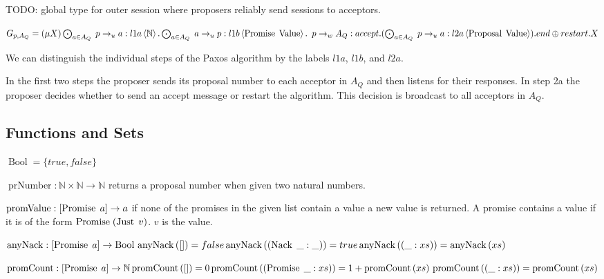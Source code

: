 TODO: global type for outer session where proposers reliably send sessions to acceptors.

$G_{p, A_Q} = (\mu X) \bigodot_{a \in A_Q}\; p \to_u a : l1a \left\langle \mathbb{N} \right\rangle . \bigodot_{a \in A_Q}\; a \to_u p : l1b \left\langle \operatorname{Promise}\; \operatorname{Value} \right\rangle .\\
\hspace*{0.5em}p \to_w A_Q : accept.(\bigodot_{a \in A_Q}\; p \to_u a : l2a \left\langle \operatorname{Proposal}\; \operatorname{Value} \right\rangle).end \oplus restart.X$

We can distinguish the individual steps of the Paxos algorithm by the labels $l1a$, $l1b$, and $l2a$.

In the first two steps the proposer sends its proposal number to each acceptor in $A_Q$ and then listens for their responses.
In step 2a the proposer decides whether to send an accept message or restart the algorithm.
This decision is broadcast to all acceptors in $A_Q$.

\subsection{Functions and Sets}
\newcommand{\Bool}[0]{\operatorname{Bool}}
\newcommand{\prNumber}[2]{\operatorname{prNumber}\left( #1, #2 \right)}
\newcommand{\promValue}[1]{\operatorname{promValue}\left(#1\right)}
\newcommand{\anyNack}[1]{\operatorname{anyNack}\left(#1\right)}
\newcommand{\promCount}[1]{\operatorname{promCount}\left(#1\right)}
\newcommand{\greaterThan}[2]{\operatorname{gt}\left(#1, #2\right)}
\newcommand{\greaterEqual}[2]{\operatorname{ge}\left(#1, #2\right)}
\newcommand{\nFromPr}[1]{\operatorname{nFromPr}\left(#1 \right)}

$\Bool = \{ true, false \}$

$\operatorname{prNumber} : \mathbb{N} \times \mathbb{N} \to \mathbb{N}$ returns a proposal number when given two natural numbers.

$\operatorname{promValue} : [\operatorname{Promise}\; a] \to a$ if none of the promises in the given list contain a value a new value is returned.
A promise contains a value if it is of the form $\operatorname{Promise}\; (\operatorname{Just}\; v)$.
$v$ is the value.

$\operatorname{anyNack} : [\Promise{a}] \to \Bool\\
\anyNack{[]} = false\\
\anyNack{(\Nack{\_}: \_)} = true\\
\anyNack{(\_:xs)} = \anyNack{xs}$

$\operatorname{promCount} : [\Promise{a}] \to \mathbb{N}\\
\promCount{[]} = 0\\
\promCount{(\Promise{\_}:xs)} = 1 + \promCount{xs}\\
\promCount{(\_:xs)} = \promCount{xs}$

